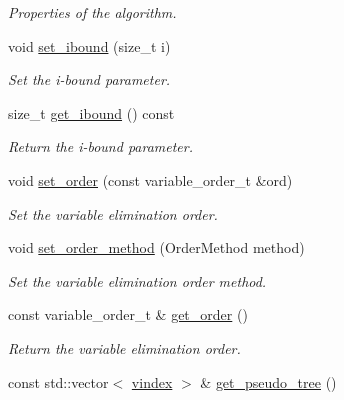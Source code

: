 \begin{DoxyCompactItemize}
\begin{DoxyCompactList}\small\item\em Properties of the algorithm. \end{DoxyCompactList}\item 
void \hyperlink{classmerlin_1_1jglp_a81a1ba0a30b0a415f95438b4e3b4979b}{set\+\_\+ibound} (size\+\_\+t i)
\begin{DoxyCompactList}\small\item\em Set the i-\/bound parameter. \end{DoxyCompactList}\item 
size\+\_\+t \hyperlink{classmerlin_1_1jglp_ab9b49439616ac5cc826dc3614d522ba8}{get\+\_\+ibound} () const \hypertarget{classmerlin_1_1jglp_ab9b49439616ac5cc826dc3614d522ba8}{}\label{classmerlin_1_1jglp_ab9b49439616ac5cc826dc3614d522ba8}

\begin{DoxyCompactList}\small\item\em Return the i-\/bound parameter. \end{DoxyCompactList}\item 
void \hyperlink{classmerlin_1_1jglp_ada0022232bd0e11e043d997341ebeb8c}{set\+\_\+order} (const variable\+\_\+order\+\_\+t \&ord)
\begin{DoxyCompactList}\small\item\em Set the variable elimination order. \end{DoxyCompactList}\item 
void \hyperlink{classmerlin_1_1jglp_a0cc988afd7be26d8e3abe557e87ca445}{set\+\_\+order\+\_\+method} (Order\+Method method)
\begin{DoxyCompactList}\small\item\em Set the variable elimination order method. \end{DoxyCompactList}\item 
const variable\+\_\+order\+\_\+t \& \hyperlink{classmerlin_1_1jglp_a03f29b87c291dc6c759c0ddef24569b8}{get\+\_\+order} ()\hypertarget{classmerlin_1_1jglp_a03f29b87c291dc6c759c0ddef24569b8}{}\label{classmerlin_1_1jglp_a03f29b87c291dc6c759c0ddef24569b8}

\begin{DoxyCompactList}\small\item\em Return the variable elimination order. \end{DoxyCompactList}\item 
const std\+::vector$<$ \hyperlink{classmerlin_1_1jglp_a85f09fc4dc206dd719f08d08b1db9591}{vindex} $>$ \& \hyperlink{classmerlin_1_1jglp_a3b2d6adcead0b1ec15ef9d0fbf412d1b}{get\+\_\+pseudo\+\_\+tree} ()\hypertarget{classmerlin_1_1jglp_a3b2d6adcead0b1ec15ef9d0fbf412d1b}{}\label{classmerlin_1_1jglp_a3b2d6adcead0b1ec15ef9d0fbf412d1b}


\end{DoxyCompactItemize}
